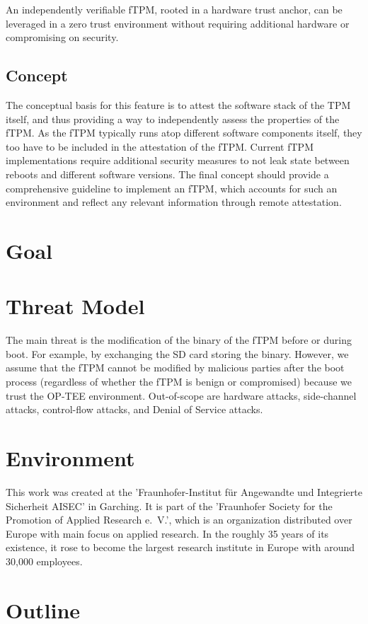 An independently verifiable fTPM, rooted in a hardware trust anchor, can be leveraged in a zero trust environment without requiring additional hardware or compromising on security.

\subsection{Concept}
The conceptual basis for this feature is to attest the software stack of the TPM itself, and thus providing a way to independently assess the properties of the fTPM.
As the fTPM typically runs atop different software components itself, they too have to be included in the attestation of the fTPM.
Current fTPM implementations require additional security measures to not leak state between reboots and different software versions.
The final concept should provide a comprehensive guideline to implement an fTPM, which accounts for such an environment and reflect any relevant information through remote attestation.

\section{Goal}
\section{Threat Model}

The main threat is the modification of the binary of the fTPM before or during boot. For example, by exchanging the SD card storing the binary.
However, we assume that the fTPM cannot be modified by malicious parties after the boot process (regardless of whether the fTPM is benign or compromised) because we trust the OP-TEE environment.
Out-of-scope are hardware attacks, side-channel attacks, control-flow attacks, and Denial of Service attacks.



\section{Environment}

This work was created at the 'Fraunhofer-Institut für Angewandte und Integrierte Sicherheit AISEC' in Garching.
It is part of the 'Fraunhofer Society for the Promotion of Applied Research e.~V.', which is an organization distributed over Europe with main focus on applied research.
In the roughly 35 years of its existence, it rose to become the largest research institute in Europe with around 30,000 employees.

\section{Outline}

